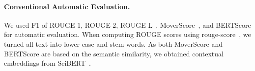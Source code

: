 \paragraph{Conventional Automatic Evaluation.}
We used F1 of ROUGE-1, ROUGE-2, ROUGE-L~\cite{lin-2004-rouge,nallapati-etal-2016-abstractive}, 
MoverScore~\cite{zhao-etal-2019-moverscore}, and BERTScore for automatic evaluation. 
When computing ROUGE scores using rouge-score~\cite{rouge-scorer},
we turned all text into lower case and stem words.
As both MoverScore and BERTScore are based on the semantic similarity,
we obtained contextual embeddings from SciBERT~\cite{beltagy-etal-2019-scibert}.








